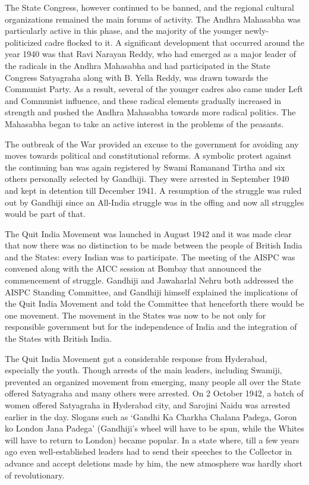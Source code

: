 The State Congress, however continued to be banned, and the regional cultural organizations remained the main forums of activity. The Andhra Mahasabha was particularly active in this phase, and the majority of the younger newly-politicized cadre flocked to it. A significant development that occurred around the year 1940 was that Ravi Narayan Reddy, who had emerged as a major leader of the radicals in the Andhra Mahasabha and had participated in the State Congress Satyagraha along with B. Yella Reddy, was drawn towards the Communist Party. As a result, several of the younger cadres also came under Left and Communist influence, and these radical elements gradually increased in strength and pushed the Andhra Mahasabha towards more radical politics. The Mahasabha began to take an active interest in the problems of the peasants. 

The outbreak of the War provided an excuse to the government for avoiding any moves towards political and constitutional reforms. A symbolic protest against the continuing ban was again registered by Swami Ramanand Tirtha and six others personally selected by Gandhiji. They were arrested in September 1940 and kept in detention till December 1941. A resumption of the struggle was ruled out by Gandhiji since an All-India struggle was in the offing and now all struggles would be part of that. 

The Quit India Movement was launched in August 1942 and it was made clear that now there was no distinction to be made between the people of British India and the States: every Indian was to participate. The meeting of the AISPC was convened along with the AICC session at Bombay that announced the commencement of struggle. Gandhiji and Jawaharlal Nehru both addressed the AISPC Standing Committee, and Gandhiji himself explained the implications of the Quit India Movement and told the Committee that henceforth there would be one movement. The movement in the States was now to be not only for responsible government but for the independence of India and the integration of the States with British India. 

The Quit India Movement got a considerable response from Hyderabad, especially the youth. Though arrests of the main leaders, including Swamiji, prevented an organized movement from emerging, many people all over the State offered Satyagraha and many others were arrested. On 2 October 1942, a batch of women offered Satyagraha in Hyderabad city, and Sarojini Naidu was arrested earlier in the day. Slogans such as ‘Gandhi Ka Charkha Chalana Padega, Goron ko London Jana Padega’ (Gandhiji’s wheel will have to be spun, while the Whites will have to return to London) became popular. In a state where, till a few years ago even well-established leaders had to send their speeches to the Collector in advance and accept deletions made by him, the new atmosphere was hardly short of revolutionary. 

